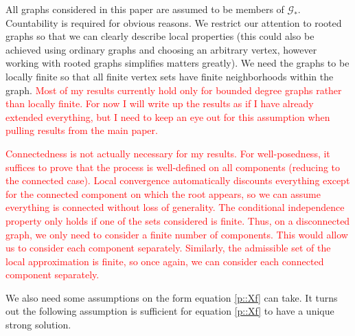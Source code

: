 \documentclass[12pt]{article}
\newcommand{\mc}{\mathcal}
\newcommand{\tr}{\textcolor{red}}
\newcommand{\ind}{\hspace{24pt}}
\newcommand{\Gs}{\mc{G}_\ast}						%
\begin{document}
All graphs considered in this paper are assumed to be members of \(\Gs\). Countability is required for obvious reasons. We restrict our attention to rooted graphs so that we can clearly describe local properties (this could also be achieved using ordinary graphs and choosing an arbitrary vertex, however working with rooted graphs simplifies matters greatly). We need the graphs to be locally finite so that all finite vertex sets have finite neighborhoods within the graph. \tr{Most of my results currently hold only for bounded degree graphs rather than locally finite. For now I will write up the results as if I have already extended everything, but I need to keep an eye out for this assumption when pulling results from the main paper.}

\ind \tr{Connectedness is not actually necessary for my results. For well-posedness, it suffices to prove that the process is well-defined on all components (reducing to the connected case). Local convergence automatically discounts everything except for the connected component on which the root appears, so we can assume everything is connected without loss of generality. The conditional independence property only holds if one of the sets considered is finite. Thus, on a disconnected graph, we only need to consider a finite number of components. This would allow us to consider each component separately. Similarly, the admissible set of the local approximation is finite, so once again, we can consider each connected component separately.}

We also need some assumptions on the form equation \eqref{p::Xf} can take. It turns out the following assumption is sufficient for equation \eqref{p::Xf} to have a unique strong solution.
\end{document}
